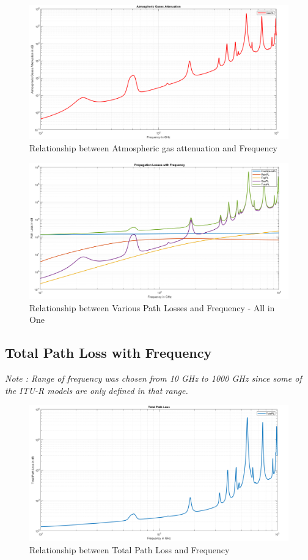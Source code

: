 \documentclass[a4paper,11pt]{article}%
\begin{document}
\begin{figure}[!h]
	\centering
	\includegraphics[scale=0.35]{figures/gpl}
	\caption{Relationship between Atmospheric gas attenuation and Frequency}
\end{figure}

\begin{figure}[!h]
	\centering
	\includegraphics[scale=0.45]{figures/all}
	\caption{Relationship between Various Path Losses and Frequency - All in One}
\end{figure}
\subsection{Total Path Loss with Frequency}
\textit{Note : Range of frequency was chosen from 10 GHz to 1000 GHz since some of the ITU-R models are only defined in that range.}
\begin{figure}[!h]
	\centering
	\includegraphics[scale=0.35]{figures/tpl}
	\caption{Relationship between Total Path Loss and Frequency}
\end{figure}
\end{document}
